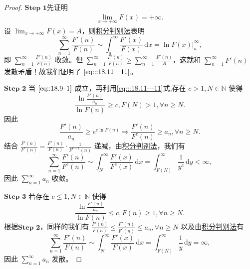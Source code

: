 \documentclass[../../main.tex]{subfiles}
\begin{document}
\begin{proof}
$\mathbf{Step}\,\,\mathbf{1}$先证明
\begin{align}
\lim_{x \to +\infty} F(x) = +\infty. \label{eq:::18.11---11}
\end{align}
设 \(\lim_{x \to +\infty} F(x) = A\)，则\hyperref[theorem:积分判别法]{积分判别法}表明
\[
\sum_{n=1}^\infty \frac{F'(n)}{F(n)} \sim \int_a^\infty \frac{F'(x)}{F(x)} \, \mathrm{d}x = \ln F(x) \big|_a^\infty,
\]
即 \(\sum_{n=1}^\infty \frac{F'(n)}{F(n)}\) 收敛。但 \(\sum_{n=1}^\infty \frac{F'(n)}{F(n)} \geqslant \sum_{n=1}^\infty \frac{F'(n)}{A}\)，这就和 \(\sum_{n=1}^\infty F'(n)\) 发散矛盾！故我们证明了 \(\eqref{eq:::18.11---11}\)。

$\mathbf{Step}\,\,\mathbf{2}$ 当 \(\eqref{eq::18.9--1}\) 成立，再利用\eqref{eq:::18.11---11}式,存在 \( c > 1, N \in \mathbb{N} \) 使得
\[
\frac{\ln \frac{F'(n)}{a_n}}{\ln F(n)} \geqslant c,F(N)>1, \forall n \geqslant N.
\]
因此
\[
\frac{F'(n)}{a_n} \geqslant e^{c \ln F(n)} \Rightarrow \frac{F'(n)}{F^c(n)} \geqslant a_n, \forall n \geqslant N.
\]
结合 \(\frac{F'(n)}{F^c(n)} = \frac{F'(n)}{F(n)} \cdot \frac{1}{F^{c - 1}(n)}\) 递减，由\hyperref[theorem:积分判别法]{积分判别法}，我们有
\[
\sum_{n=1}^\infty \frac{F'(n)}{F^c(n)} \sim \int_N^\infty \frac{F'(x)}{F^c(x)} \, \mathrm{d}x = \int_{F(N)}^\infty \frac{1}{y^c} \, \mathrm{d}y < \infty,
\]
因此 \(\sum_{n=1}^\infty a_n\) 收敛。

$\mathbf{Step}\,\,\mathbf{3}$ 若存在 \( c \leqslant 1, N \in \mathbb{N} \) 使得
\[
\frac{\ln \frac{F'(n)}{a_n}}{\ln F(n)} \leqslant c, F(n) \geqslant 1, \forall n \geqslant N.
\]
根据$\mathbf{Step}\,\,\mathbf{2}$，同样的我们有 \(\frac{F'(n)}{F(n)} \leqslant \frac{F'(n)}{F^c(n)} \leqslant a_n, \forall n \geqslant N\) 以及由\hyperref[theorem:积分判别法]{积分判别法}有
\[
\sum_{n=1}^\infty \frac{F'(n)}{F(n)} \sim \int_N^\infty \frac{F'(x)}{F(x)} \, \mathrm{d}x = \int_{F(N)}^\infty \frac{1}{y} \, \mathrm{d}y = \infty,
\]
因此 \(\sum_{n=1}^\infty a_n\) 发散。

\end{proof}
\end{document}
